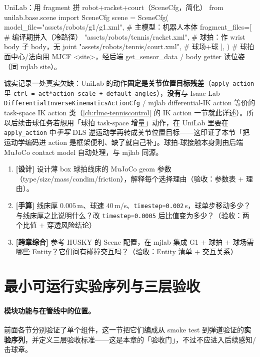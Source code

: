 \begin{codebox}[Python]{UniLab：用 fragment 拼 robot+racket+court（SceneCfg，简化）}
from unilab.base.scene import SceneCfg
scene = SceneCfg(
    model_file="assets/robots/g1/g1.xml",          # 主模型：机器人本体
    fragment_files=[                                # 编译期拼入（冷路径）
        "assets/robots/tennis/racket.xml",         # 球拍：作 wrist body 子 body，无 joint
        "assets/robots/tennis/court.xml",          # 球场+球
    ],
)
# 球拍面中心/法向用 MJCF <site>，经后端 get_sensor_data / body getter 读位姿（同 mjlab site）。
\end{codebox}

诚实记录一处真实欠缺：UniLab 的动作\textbf{固定是关节位置目标残差}（\verb|apply_action| 里 \verb|ctrl = act*action_scale + default_angles|），\textbf{没有}与 Isaac Lab \verb|DifferentialInverseKinematicsActionCfg| / mjlab differential-IK action 等价的 task-space IK action 类（\cref{ch:rlmc-tenniscontrol} 的 IK action 一节就此详述）。所以后续击球任务若想用「球拍 task-space 增量」动作，在 UniLab 里要在 \verb|apply_action| 中\emph{手写} DLS 逆运动学再转成关节位置目标——这印证了本节「把运动学编码进 action 是框架便利、缺了就自己补」。球拍-球接触本身则由后端 MuJoCo contact model 自动处理，与 mjlab 同源。

\begin{practice}[本节动手任务]
\begin{enumerate}
  \item \textbf{[设计]} 设计薄 box 球拍线床的 MuJoCo geom 参数（type/size/mass/condim/friction），解释每个选择理由（验收：参数表 $+$ 理由）。
  \item \textbf{[手算]} 线床厚 $0.005$\,m、球速 $40$\,m/s、\verb|timestep=0.002|\,s，球单步移动多少？与线床厚之比说明什么？改 \verb|timestep=0.0005| 后比值变为多少？（验收：两个比值 $+$ 穿透风险结论）
  \item \textbf{[跨章综合]} 参考 HUSKY 的 Scene 配置，在 mjlab 集成 G1 $+$ 球拍 $+$ 球场需哪些 Entity？它们间有碰撞交互吗？（验收：Entity 清单 $+$ 交互关系）
\end{enumerate}
\end{practice}

\section{最小可运行实验序列与三层验收}
\label{sec:rlmc-tennis-suite}

\paragraph{模块功能与在管线中的位置。}前面各节分别验证了单个组件，这一节把它们编成从 smoke test 到弹道验证的\textbf{实验序列}，并定义三层验收标准——这是本章的「验收门」，不过不应进入后续感知/击球章。

